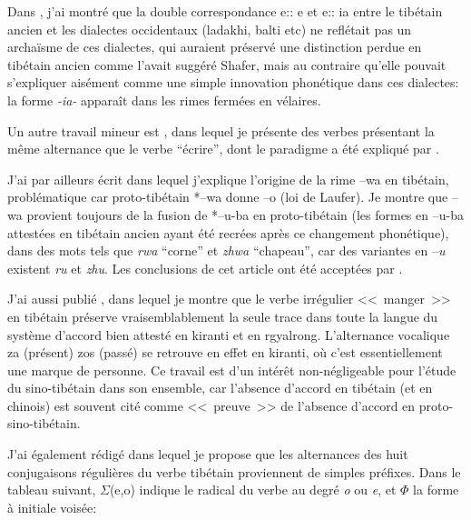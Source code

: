 \documentclass[oldfontcommands,oneside,a4paper,11pt]{memoir}
\newcommand{\sig}{\begin{math}\Sigma\end{math}}
\newcommand{\phone}{\begin{math}\Phi\end{math}}
\begin{document}
Dans \citet{jacques09e}, j'ai montré que la double correspondance e:: e et e:: ia entre le tibétain ancien et les dialectes occidentaux (ladakhi, balti etc) ne reflétait pas un archaïsme de ces dialectes, qui auraient préservé une distinction perdue en tibétain ancien comme l'avait suggéré Shafer, mais au contraire qu'elle pouvait s'expliquer aisément comme une simple innovation phonétique dans ces dialectes: la forme \textit{-ia-} apparaît dans les rimes fermées en vélaires.

Un autre travail mineur est \citet{jacques10ndr}, dans lequel je présente des verbes présentant la même alternance que le verbe ``écrire'', dont le paradigme a été expliqué par \citet{hill05vbri}.

J'ai par ailleurs écrit \citet{jacques09wazur} dans lequel j'explique l'origine de la rime --wa en tibétain, problématique car proto-tibétain *--wa donne --o (loi de Laufer). Je montre que --wa provient toujours de la fusion de *--u-ba en proto-tibétain (les formes en --u-ba attestées en tibétain ancien ayant été recrées après ce changement phonétique), dans des mots tels que \textit{rwa} ``corne'' et \textit{zhwa} ``chapeau'', car des variantes en --\textit{u} existent \textit{ru} et \textit{zhu}. Les conclusions de cet article ont été acceptées par \citealt{hill11laws}.

J'ai aussi publié \citet{jacques10zos}, dans lequel je montre que le verbe irrégulier <<~manger~>> en tibétain préserve vraisemblablement la seule trace dans toute la langue du système d'accord bien attesté en kiranti et en rgyalrong. L'alternance vocalique za (présent) zos (passé) se retrouve en effet en kiranti, où c'est essentiellement une marque de personne.
Ce travail est d'un intérêt non-négligeable pour l'étude du sino-tibétain dans son ensemble, car l'absence d'accord en tibétain (et en chinois) est souvent cité comme <<~preuve~>> de l'absence d'accord en proto-sino-tibétain.

J'ai également rédigé \citet{jacques12internal} dans lequel je propose que les alternances des huit conjugaisons régulières du verbe tibétain proviennent de simples préfixes. Dans le tableau suivant, \sig{}(e,o) indique le radical du verbe au degré \textit{o} ou \textit{e}, et \phone{} la forme à initiale voisée:
\end{document}
